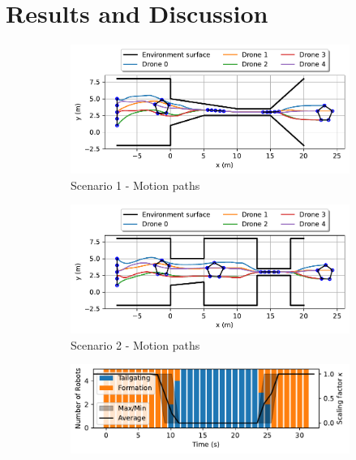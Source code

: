 \section{Results and Discussion}\label{sec:result}

\begin{figure}
    \centering
    \begin{subfigure}[b]{0.495\textwidth}
    \includegraphics[width=\textwidth]{paper3/images/path_scen1.pdf}
    \caption{Scenario 1 - Motion paths}
    \end{subfigure}
    \begin{subfigure}[b]{0.495\textwidth}
    \includegraphics[width=\textwidth]{paper3/images/path_scen2.pdf}
    \caption{Scenario 2 - Motion paths}
    \end{subfigure}
    \begin{subfigure}[b]{0.495\textwidth}
    \includegraphics[width=\textwidth]{paper3/images/correlation_scen1.pdf}

\end{subfigure}
\end{figure}
